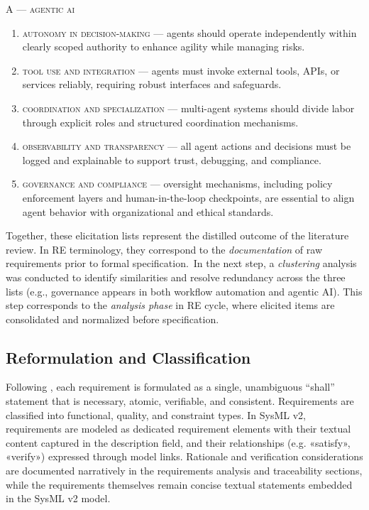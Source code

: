\noindent\textsc{A --- agentic ai}
\begin{enumerate}
  \item \textsc{autonomy in decision-making} --- agents should operate independently within clearly scoped authority to enhance agility while managing risks.
  \item \textsc{tool use and integration} --- agents must invoke external tools, APIs, or services reliably, requiring robust interfaces and safeguards.
  \item \textsc{coordination and specialization} --- multi-agent systems should divide labor through explicit roles and structured coordination mechanisms.
  \item \textsc{observability and transparency} --- all agent actions and decisions must be logged and explainable to support trust, debugging, and compliance.
  \item \textsc{governance and compliance} --- oversight mechanisms, including policy enforcement layers and human-in-the-loop checkpoints, are essential to align agent behavior with organizational and ethical standards.
\end{enumerate}

Together, these elicitation lists represent the distilled outcome of the literature review. In RE terminology, they correspond to the \emph{documentation} of raw requirements prior to formal specification.~In the next step, a \emph{clustering} analysis was conducted to identify similarities and resolve redundancy across the three lists (e.g., governance appears in both workflow automation and agentic AI). This step corresponds to the \emph{analysis phase} in \textcite{herrmannGrundlagen2022} RE cycle, where elicited items are consolidated and normalized before specification.


\subsection{Reformulation and Classification}\label{subsec:req-clas}
Following \textcite{glinzHandbook2020}, each requirement is formulated as a single, unambiguous “shall” statement that is necessary, atomic, verifiable, and consistent. Requirements are classified into functional, quality, and constraint types. In SysML v2, requirements are modeled as dedicated requirement elements with their textual content captured in the description field, and their relationships (e.g. «satisfy», «verify») expressed through model links. Rationale and verification considerations are documented narratively in the requirements analysis and traceability sections, while the requirements themselves remain concise textual statements embedded in the SysML v2 model.

